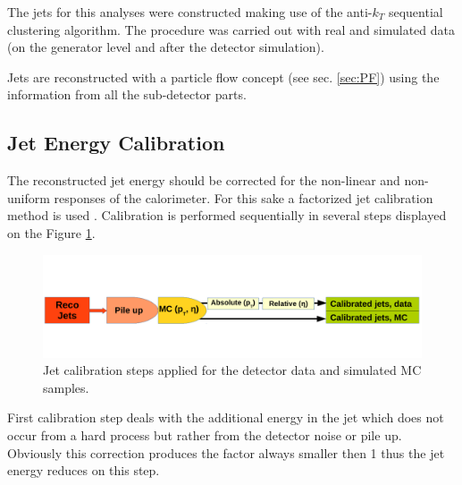The jets for this analyses were constructed making use of the anti-$k_{T}$ sequential clustering algorithm. The procedure was carried out with real and
simulated data (on the generator level and after the detector simulation).

Jets are reconstructed with a particle flow concept (see sec. \ref{sec:PF}) using the information from all the sub-detector parts.

\subsection{Jet Energy Calibration}

The reconstructed jet energy should be corrected for the non-linear and non-uniform responses of the calorimeter. For this sake a factorized jet calibration
method is used \cite{2011JInst...611002C}. Calibration is performed sequentially in several steps displayed on the Figure \ref{fig:JECsc}.

\begin{figure}[h]
  \centering
  \includegraphics[width=1.0\textwidth]{04_event_reconstruction/plots/JEC.pdf}
  \caption{Jet calibration steps applied for the detector data and simulated MC samples.}
  \label{fig:JECsc}
\end{figure}

First calibration step deals with the additional energy in the jet which does not occur from a hard process but rather from the detector noise or pile up. 
Obviously this correction produces the factor always smaller then 1 thus the jet energy reduces on this step.
% 
% 
% 
